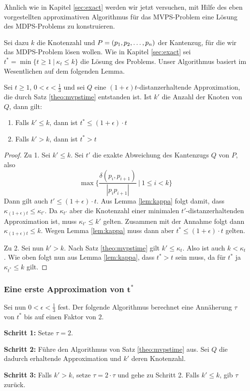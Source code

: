 Ähnlich wie in Kapitel \ref{sec:exact} werden wir jetzt versuchen, mit Hilfe des eben vorgestellten approximativen Algorithmus für das MVPS-Problem eine Lösung des MDPS-Problems zu konstruieren.
	
Sei dazu $k$ die Knotenzahl und $P = (p_1, p_2, \mathellipsis, p_n)$ der Kantenzug, für die wir das MDPS-Problem lösen wollen. 
Wie in Kapitel \ref{sec:exact} sei $t^* = \min\{t \geq 1\ |\ \kappa_t \leq k\}$ die Lösung des Problems. 
Unser Algorithmus basiert im Wesentlichen auf dem folgenden Lemma.

\begin{lemma}
	\label{lem:tstar}
	Sei $t \geq 1$, $0 < \epsilon < \frac{1}{3}$ und sei $Q$ eine $(1 + \epsilon)t$-distanzerhaltende Approximation, die durch Satz \ref{theo:mvpstime} entstanden ist. Ist $k'$ die Anzahl der Knoten von $Q$, dann gilt:
	\begin{enumerate}
		\item Falls $k' \leq k$, dann ist $t^* \leq (1 + \epsilon) \cdot t$
		\item Falls $k' > k$, dann ist $t^* > t$
	\end{enumerate}
\end{lemma}
\begin{proof}
	Zu 1. Sei $k' \leq k$. Sei $t'$ die exakte Abweichung des Kantenzugs $Q$ von $P$, also 
	\[
	\max\{\frac{\delta(p_i, p_{i+1})}{|p_ip_{i+1}|}\ |\ 1 \leq i < k\}
	\] 
	Dann gilt auch $t' \leq (1 + \epsilon) \cdot t$. 
	Aus Lemma \ref{lem:kappa} folgt damit, dass $\kappa_{(1 + \epsilon)t} \leq \kappa_{t'}$.
	Da $\kappa_{t'}$ aber die Knotenzahl einer minimalen $t'$-distanzerhaltenden Approximation ist, muss $\kappa_{t'} \leq k'$ gelten. Zusammen mit der Annahme folgt dann $\kappa_{(1 + \epsilon)t} \leq k$. Wegen Lemma \ref{lem:kappa} muss dann aber $t^* \leq (1 + \epsilon) \cdot t$ gelten.
	
	Zu 2. Sei nun $k' > k$. Nach Satz \ref{theo:mvpstime} gilt $k' \leq \kappa_t$. Also ist auch $k < \kappa_t$. Wie oben folgt nun aus Lemma \ref{lem:kappa}, dass $t^* > t$ sein muss, da für $t^*$ ja $\kappa_{t^*} \leq k$ gilt.		
\end{proof}

\subsubsection*{Eine erste Approximation von $\mathbf{t^*}$}

Sei nun $0 < \epsilon < \frac{1}{3}$ fest.
Der folgende Algorithmus berechnet eine Annäherung $\tau$ von $t^*$ bis auf einen Faktor von $2$.
\begin{description}
	\item{\textbf{Schritt 1:}} Setze $\tau = 2$.
	\item{\textbf{Schritt 2:}} Führe den Algorithmus von Satz \ref{theo:mvpstime} aus. Sei $Q$ die dadurch erhaltende Approximation und $k'$ deren Knotenzahl.
	\item{\textbf{Schritt 3:}} Falls $k' > k$, setze $\tau = 2 \cdot \tau$ und gehe zu Schritt 2.
	Falls $k' \leq k$, gib $\tau$ zurück.
\end{description}

